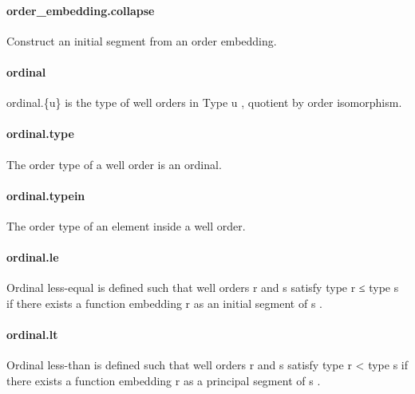 \documentclass{article}
\begin{document}
\paragraph{order\_embedding.collapse}
\par
Construct an initial segment from an order embedding.
\paragraph{ordinal}
\par
\colorbox[RGB]{253,246,227}{{{{\color[RGB]{101, 123, 131} ordinal.\{u\} }}}} is the type of well orders in 
\colorbox[RGB]{253,246,227}{{{{\color[RGB]{38, 139, 210} Type }}}{{{\color[RGB]{101, 123, 131}  u }}}},
quotient by order isomorphism.
\paragraph{ordinal.type}
\par
The order type of a well order is an ordinal.
\paragraph{ordinal.typein}
\par
The order type of an element inside a well order.
\paragraph{ordinal.le}
\par
Ordinal less-equal is defined such that
well orders 
\colorbox[RGB]{253,246,227}{{{{\color[RGB]{101, 123, 131} r }}}} and 
\colorbox[RGB]{253,246,227}{{{{\color[RGB]{101, 123, 131} s }}}} satisfy 
\colorbox[RGB]{253,246,227}{{{{\color[RGB]{101, 123, 131} type r  }}}{{{\color[RGB]{181, 137, 0} ≤ }}}{{{\color[RGB]{101, 123, 131}  type s }}}} if there exists
a function embedding 
\colorbox[RGB]{253,246,227}{{{{\color[RGB]{101, 123, 131} r }}}} as an initial segment of 
\colorbox[RGB]{253,246,227}{{{{\color[RGB]{101, 123, 131} s }}}}.
\paragraph{ordinal.lt}
\par
Ordinal less-than is defined such that
well orders 
\colorbox[RGB]{253,246,227}{{{{\color[RGB]{101, 123, 131} r }}}} and 
\colorbox[RGB]{253,246,227}{{{{\color[RGB]{101, 123, 131} s }}}} satisfy 
\colorbox[RGB]{253,246,227}{{{{\color[RGB]{101, 123, 131} type r  }}}{{{\color[RGB]{181, 137, 0} < }}}{{{\color[RGB]{101, 123, 131}  type s }}}} if there exists
a function embedding 
\colorbox[RGB]{253,246,227}{{{{\color[RGB]{101, 123, 131} r }}}} as a principal segment of 
\colorbox[RGB]{253,246,227}{{{{\color[RGB]{101, 123, 131} s }}}}.
\end{document}
